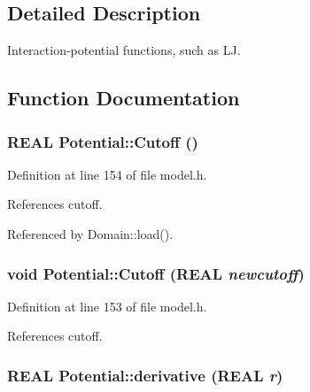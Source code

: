 \subsection{Detailed Description}
Interaction-potential functions, such as LJ. 



\subsection{Function Documentation}
\hypertarget{namespacePotential_4a1d0ff492f72f8a5962f07f483caa1f}{
\subsubsection[{Cutoff}]{\setlength{\rightskip}{0pt plus 5cm}REAL Potential::Cutoff ()}}
\label{namespacePotential_4a1d0ff492f72f8a5962f07f483caa1f}




Definition at line 154 of file model.h.

References cutoff.

Referenced by Domain::load().\hypertarget{namespacePotential_623b983939aa06313660e1e37d796ddc}{
\subsubsection[{Cutoff}]{\setlength{\rightskip}{0pt plus 5cm}void Potential::Cutoff (REAL {\em newcutoff})}}
\label{namespacePotential_623b983939aa06313660e1e37d796ddc}




Definition at line 153 of file model.h.

References cutoff.\hypertarget{namespacePotential_1bbfae0bac5bc358795ba5de0c255cb3}{
\subsubsection[{derivative}]{\setlength{\rightskip}{0pt plus 5cm}REAL Potential::derivative (REAL {\em r})}}
\label{namespacePotential_1bbfae0bac5bc358795ba5de0c255cb3}


